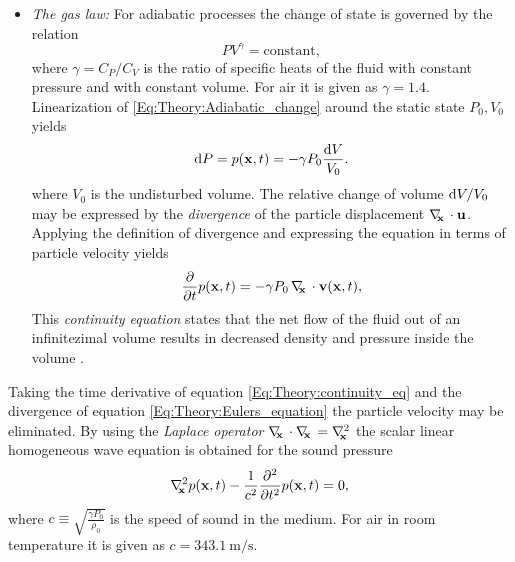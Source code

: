 \begin{itemize}
\item \emph{The gas law:} For adiabatic processes the change of state is governed by the relation
\begin{equation}
P V^{\gamma} = \mathrm{constant},
\label{Eq:Theory:Adiabatic_change}
\end{equation}
where $\gamma = C_P/C_V$ is the ratio of specific heats of the fluid with constant pressure and with constant volume.
For air it is given as $\gamma = 1.4$.
Linearization of \eqref{Eq:Theory:Adiabatic_change} around the static state $P_0, V_0$ yields
\begin{equation}
\mathrm{d} P = p(\mathbf{x},t) = -\gamma P_0 \frac{\mathrm{d} V}{V_0}.
\end{equation}
where $V_0$ is the undisturbed volume. 
The relative change of volume $\mathrm{d} V / V_0$ may be expressed by the  \emph{divergence} of the particle displacement $\nabla_{\!\!\mathbf{x}}\, \cdot \mathbf{u}$. 
Applying the definition of divergence and expressing the equation in terms of particle velocity yields
\begin{equation}
\frac{\partial}{\partial t} p(\mathbf{x},t) = -\gamma P_0 \, \nabla_{\!\!\mathbf{x}}\, \cdot \mathbf{v}(\mathbf{x},t),
\label{Eq:Theory:continuity_eq}
\end{equation}
This \emph{continuity equation} states that the net flow of the fluid out of an infinitezimal volume results in decreased density and pressure inside the volume \cite{Arfken2005}.
\end{itemize}
%
%
Taking the time derivative of equation \eqref{Eq:Theory:continuity_eq} and the divergence of equation \eqref{Eq:Theory:Eulers_equation} the particle velocity may be eliminated. 
By using the \emph{Laplace operator} $\nabla_{\!\!\mathbf{x}}\, \cdot \nabla_{\!\!\mathbf{x}}\, = \nabla^2_{\!\!\mathbf{x}}$ the scalar linear homogeneous wave equation is obtained for the sound pressure
\begin{equation}
\nabla^2_{\!\!\mathbf{x}} p(\mathbf{x},t) - \frac{1}{c^2} \frac{\partial^2}{\partial t^2} p(\mathbf{x},t) = 0,
\label{Eq:Theory:Scalar_wave_equation}
\end{equation}
%
%
where $c \equiv \sqrt{ \frac{\gamma P_0}{\rho_0} }$ is the speed of sound in the medium. 
For air in room temperature it is given as $c = 343.1 ~ \mathrm{m}/\mathrm{s}$.
